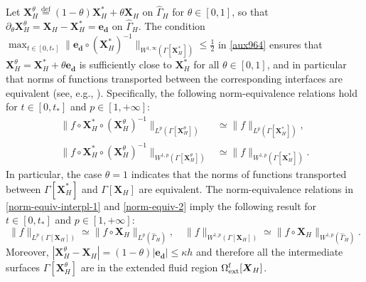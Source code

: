 \documentclass[11pt,reqno]{amsart}
\theoremstyle{definition}
\theoremstyle{plain}
\numberwithin{theorem}{section}
\numberwithin{proposition}{section}
\numberwithin{lemma}{section}
\numberwithin{equation}{section}
\newcommand{\bs}[1]{\boldsymbol{#1}}
\newcommand{\dep}{{{\bs{d}}}}
\renewcommand{\(}{\bigl(}
\renewcommand{\)}{\bigr)}
\def\eqd{\stackrel{\mathrm{def}}{=}}
\begin{document}
Let ${\bs X}_H^\theta \eqd (1-\theta) {\bs X}_H^* + \theta {\bs X}_H$ on $\widehat\Gamma_H$ for $\theta\in[0,1]$, so that $\partial_\theta {\bs X}_H^\theta = {\bs X}_H-{\bs X}_H^* = {\bs e}_\dep$ on $\widehat\Gamma_H$. The condition
$\max_{t\in[0,t_*]} \|{\bs e}_\dep \circ ({\bs X}_H^*)^{-1}\|_{W^{1,\infty}(\Gamma[{\bs X}_H^*])}  \le \frac12$
in \eqref{aux964} ensures that ${\bs X}_H^\theta = {\bs X}_H^* + \theta {\bs e}_{\bs d}$ is sufficiently close to ${\bs X}_H^*$ for all $\theta\in[0,1]$, and in particular that norms of functions transported between the corresponding interfaces are equivalent (see, e.g., \cite[Lemma 4.3]{KLLP-2017}). Specifically, the following norm-equivalence relations hold for $t\in[0,t_*]$ and $p\in[1,+\infty]$:
\begin{subequations}\label{norm-equiv-2}
\begin{align}
\| f \circ {\bs X}_H^* \circ({\bs X}_H^\theta)^{-1} \|_{L^p(\Gamma[\bs X_H^\theta])} & \simeq \| f \|_{L^p(\Gamma[\bs X_H^*])} , \\
\| f \circ {\bs X}_H^* \circ({\bs X}_H^\theta)^{-1} \|_{W^{1,p}(\Gamma[\bs X_H^\theta])} & \simeq \| f \|_{W^{1,p}(\Gamma[\bs X_H^*])}  .
\end{align}
\end{subequations} 
In particular, the case $\theta=1$ indicates that the norms of functions transported between $\Gamma[\bs X_H^*]$ and $\Gamma[\bs X_H]$ are equivalent. The norm-equivalence relations in \eqref{norm-equiv-interpl-1} and \eqref{norm-equiv-2} imply the following result for $t\in[0,t_*]$ and $p\in[1,+\infty]$:
\begin{equation}\label{norm-equiv-GH}
\| f \|_{L^p(\Gamma[{\bs X}_H])} \simeq \| f\circ {\bs X}_H\|_{L^p(\widehat\Gamma_H)},\quad
\| f \|_{W^{1,p}(\Gamma[{\bs X}_H])} \simeq \| f\circ {\bs X}_H\|_{W^{1,p}(\widehat\Gamma_H)}.
\end{equation} 
Moreover, $|{\bs X}_H^\theta -{\bs X}_H | = (1-\theta) |{\bs e}_{\bs d}|\leq \kappa h$ and therefore all the intermediate surfaces $\Gamma[{\bs X}_H^\theta]$ are in the extended fluid region $\Omega^{\rm f}_{\rm ext}[{\bs X}_H]$.  
\end{document}
